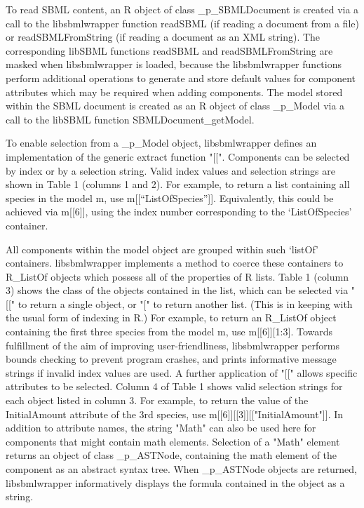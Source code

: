 \documentclass{bioinfo}
\begin{document}
\begin{methods}
To read SBML content, an R object of class \_p\_SBMLDocument is created via a call to the libsbmlwrapper function {\selectfont readSBML} (if reading a document from a file) or {\selectfont readSBMLFromString} (if reading a document as an XML string). The corresponding libSBML functions {\selectfont readSBML} and {\selectfont readSBMLFromString} are masked when libsbmlwrapper is loaded, because the libsbmlwrapper functions perform additional operations to generate and store default values for component attributes which may be required when adding components. The model stored within the SBML document is created as an R object of class \_p\_Model via a call to the libSBML function {\selectfont SBMLDocument\_getModel}.

\par To enable selection from a \_p\_Model object, libsbmlwrapper defines an implementation of the generic extract function "{\selectfont [[}". Components can be selected by index or by a selection string. Valid index values and selection strings are shown in Table 1 (columns 1 and 2). For example, to return a list containing all species in the model m, use {\selectfont m[[“ListOfSpecies”]]}. Equivalently, this could be achieved via {\selectfont m[[6]]}, using the index number corresponding to the ‘ListOfSpecies’ container.

\par All components within the model object are grouped within such ‘listOf’ containers. libsbmlwrapper implements a method to coerce these containers to R\_ListOf objects which possess all of the properties of R lists. Table 1 (column 3) shows the class of the objects contained in the list, which can be selected via "{\selectfont [[}" to return a single object, or "{\selectfont [}" to return another list. (This is in keeping with the usual form of indexing in R.) For example, to return an R\_ListOf object containing the first three species from the model m, use {\selectfont m[[6]][1:3]}. Towards fulfillment of the aim of improving user-friendliness, libsbmlwrapper performs bounds checking to prevent program crashes, and prints informative message strings if invalid index values are used. A further application of "{\selectfont [[}" allows specific attributes to be selected. Column 4 of Table 1 shows valid selection strings for each object listed in column 3. For example, to return the value of the InitialAmount attribute of the 3rd species, use {\selectfont m[[6]][[3]][["InitialAmount"]]}. In addition to attribute names, the string "Math" can also be used here for components that might contain math elements. Selection of a "Math" element returns an object of class \_p\_ASTNode, containing the math element of the component as an abstract syntax tree. When \_p\_ASTNode objects are returned, libsbmlwrapper informatively displays the formula contained in the object as a string.


\end{methods}
\end{document}
